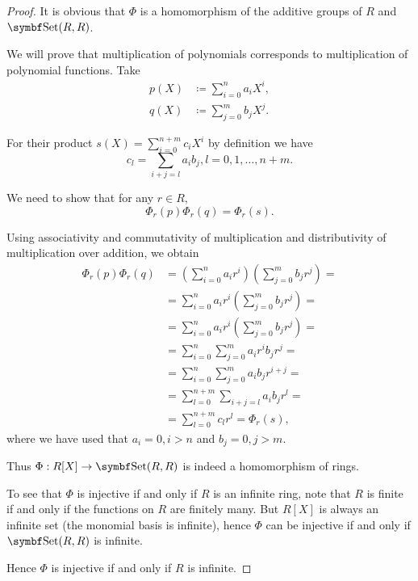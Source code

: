 \begin{proof}
  It is obvious that \( \Phi \) is a homomorphism of the additive groups of \( R \) and \( \Cat{Set}(R, R) \).

  We will prove that multiplication of polynomials corresponds to multiplication of polynomial functions. Take
  \begin{align*}
    p(X) &\coloneqq \sum_{i=0}^n a_i X^i, \\
    q(X) &\coloneqq \sum_{j=0}^m b_j X^j.
  \end{align*}

  For their product \( s(X) = \sum_{i=0}^{n + m} c_i X^i \) by definition we have
  \begin{equation*}
    c_l = \sum_{i+j=l} a_i b_j, l = 0, 1, \ldots, n + m.
  \end{equation*}

  We need to show that for any \( r \in R \),
  \begin{equation*}
    \Phi_r(p) \Phi_r(q) = \Phi_r(s).
  \end{equation*}

  Using associativity and commutativity of multiplication and distributivity of multiplication over addition, we obtain
  \begin{align*}
    \Phi_r(p) \Phi_r(q)
    &=
    \left( \sum_{i=0}^n a_i r^i \right) \left( \sum_{j=0}^m b_j r^j \right)
    = \\ &=
    \sum_{i=0}^n a_i r^i \left( \sum_{j=0}^m b_j r^j \right)
    = \\ &=
    \sum_{i=0}^n a_i r^i \left( \sum_{j=0}^m b_j r^j \right)
    = \\ &=
    \sum_{i=0}^n \sum_{j=0}^m a_i r^i b_j r^j
    = \\ &=
    \sum_{i=0}^n \sum_{j=0}^m a_i b_j r^{i + j}
    = \\ &=
    \sum_{l=0}^{n + m} \sum_{i+j=l} a_i b_j r^l
    = \\ &=
    \sum_{l=0}^{n + m} c_l r^l
    =
    \Phi_r(s),
  \end{align*}
  where we have used that \( a_i = 0, i > n \) and \( b_j = 0, j > m \).

  Thus \( \Phi: R[X] \to \Cat{Set}(R, R) \) is indeed a homomorphism of rings.

  To see that \( \Phi \) is injective if and only if \( R \) is an infinite ring, note that \( R \) is finite if and only if the functions on \( R \) are finitely many. But \( R[X] \) is always an infinite set (the monomial basis is infinite), hence \( \Phi \) can be injective if and only if \( \Cat{Set}(R, R) \) is infinite.

  Hence \( \Phi \) is injective if and only if \( R \) is infinite.
\end{proof}

